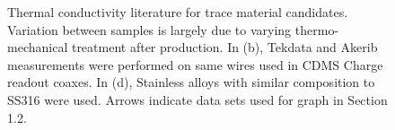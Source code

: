 \documentclass{article}
\begin{document}
\begin{figure}[h]
\begin{centering}

\caption{Thermal conductivity literature for trace material candidates. Variation between samples is largely due to varying thermo-mechanical treatment after production. In (b), Tekdata and Akerib measurements were performed on same wires used in CDMS Charge readout coaxes. In (d), Stainless alloys with similar composition to SS316 were used. Arrows indicate data sets used for graph in Section 1.2.}
\end{centering}
\end{figure}
\end{document}
